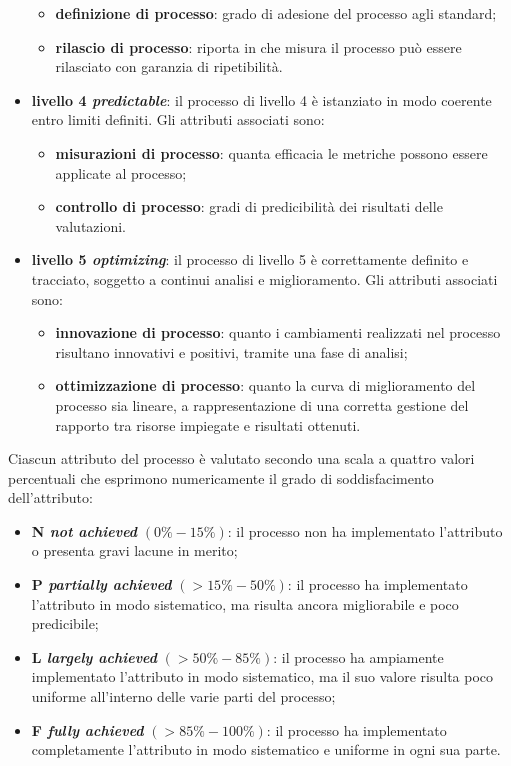 \begin{itemize}
	\begin{itemize}
	\item \textbf{definizione di processo}: grado di adesione del processo agli standard;
	\item \textbf{rilascio di processo}: riporta in che misura il processo può essere rilasciato con garanzia di ripetibilità.
	\end{itemize}
\item \textbf{livello 4 \textit{predictable}}: il processo di livello 4 è istanziato in modo coerente entro limiti definiti. Gli attributi associati sono:
	\begin{itemize}
	\item \textbf{misurazioni di processo}: quanta efficacia le metriche possono essere applicate al processo;
	\item \textbf{controllo di processo}: gradi di predicibilità dei risultati delle valutazioni.
	\end{itemize}
\item \textbf{livello 5 \textit{optimizing}}: il processo di livello 5 è correttamente definito e tracciato, soggetto a continui analisi e miglioramento. Gli attributi associati sono:
	\begin{itemize}
	\item \textbf{innovazione di processo}: quanto i cambiamenti realizzati nel processo risultano innovativi e positivi, tramite una fase di analisi;
	\item \textbf{ottimizzazione di processo}: quanto la curva di miglioramento del processo sia lineare, a rappresentazione di una corretta gestione del rapporto tra risorse impiegate e risultati ottenuti.
	\end{itemize}
\end{itemize}
Ciascun attributo del processo è valutato secondo una scala a quattro valori percentuali che esprimono numericamente il grado di soddisfacimento dell'attributo:
\begin{itemize}
\item \textbf{N \textit{not achieved}} $(0\% - 15\%)$: il processo non ha implementato l'attributo o presenta gravi lacune in merito;
\item \textbf{P \textit{partially achieved}} $(>15\% - 50\%)$: il processo ha implementato l'attributo in modo sistematico, ma risulta ancora migliorabile e poco predicibile;
\item \textbf{L \textit{largely achieved}} $(>50\% - 85\%)$: il processo ha ampiamente implementato l'attributo in modo sistematico, ma il suo valore risulta poco uniforme all'interno delle varie parti del processo;
\item \textbf{F \textit{fully achieved}} $(>85\% - 100\%)$: il processo ha implementato completamente l'attributo in modo sistematico e uniforme in ogni sua parte.
\end{itemize}
